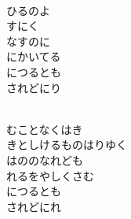 \documentclass[10pt,b5j]{tarticle} %
\begin{document}
\begin{enumerate}
\begin{minipage}[c]{\blocksize}
        \vspace{\linespace}
        \item~\\
        ひるのよ\\
        すにく\\
        なすのに\\
        にかいてる\\
        につるとも\\
        されどにり
        
        \vspace{\linespace}
        \item~\\
        むことなくはき\\
        きとしけるものはりゆく\\
        はののなれども\\
        れるをやしくさむ\\
        につるとも\\
        されどにれ
    
    \end{minipage}
\end{enumerate} %
\end{document}
